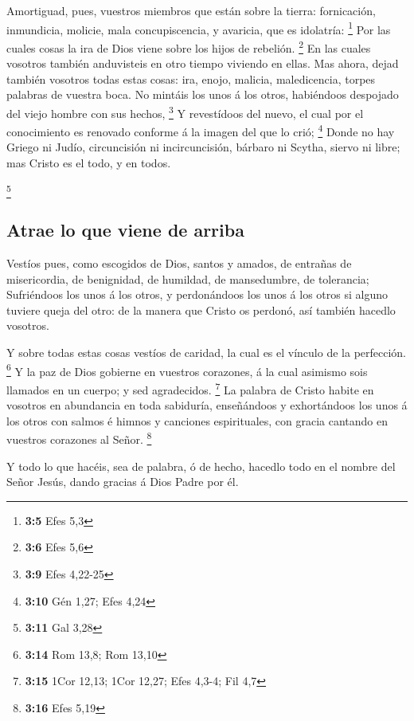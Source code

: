  Amortiguad, pues, vuestros miembros que están sobre la
tierra: fornicación, inmundicia, molicie, mala concupiscencia, y
avaricia, que es idolatría: \footnote{\textbf{3:5} Efes 5,3}
 Por las cuales cosas la ira de Dios viene sobre los hijos
de rebelión. \footnote{\textbf{3:6} Efes 5,6}  En las cuales
vosotros también anduvisteis en otro tiempo viviendo en ellas.
 Mas ahora, dejad también vosotros todas estas cosas: ira,
enojo, malicia, maledicencia, torpes palabras de vuestra boca.
 No mintáis los unos á los otros, habiéndoos despojado del
viejo hombre con sus hechos, \footnote{\textbf{3:9} Efes 4,22-25}
 Y revestídoos del nuevo, el cual por el conocimiento es
renovado conforme á la imagen del que lo crió; \footnote{\textbf{3:10}
  Gén 1,27; Efes 4,24}  Donde no hay Griego ni Judío,
circuncisión ni incircuncisión, bárbaro ni Scytha, siervo ni libre; mas
Cristo es el todo, y en todos.

\footnote{\textbf{3:11} Gal 3,28}

\hypertarget{atrae-lo-que-viene-de-arriba}{%
\subsection{Atrae lo que viene de
arriba}\label{atrae-lo-que-viene-de-arriba}}

 Vestíos pues, como escogidos de Dios, santos y amados, de
entrañas de misericordia, de benignidad, de humildad, de mansedumbre, de
tolerancia;  Sufriéndoos los unos á los otros, y
perdonándoos los unos á los otros si alguno tuviere queja del otro: de
la manera que Cristo os perdonó, así también hacedlo vosotros.

 Y sobre todas estas cosas vestíos de caridad, la cual es
el vínculo de la perfección. \footnote{\textbf{3:14} Rom 13,8; Rom 13,10}
 Y la paz de Dios gobierne en vuestros corazones, á la cual
asimismo sois llamados en un cuerpo; y sed agradecidos. \footnote{\textbf{3:15}
  1Cor 12,13; 1Cor 12,27; Efes 4,3-4; Fil 4,7}  La palabra
de Cristo habite en vosotros en abundancia en toda sabiduría,
enseñándoos y exhortándoos los unos á los otros con salmos é himnos y
canciones espirituales, con gracia cantando en vuestros corazones al
Señor. \footnote{\textbf{3:16} Efes 5,19}

 Y todo lo que hacéis, sea de palabra, ó de hecho, hacedlo
todo en el nombre del Señor Jesús, dando gracias á Dios Padre por él.

